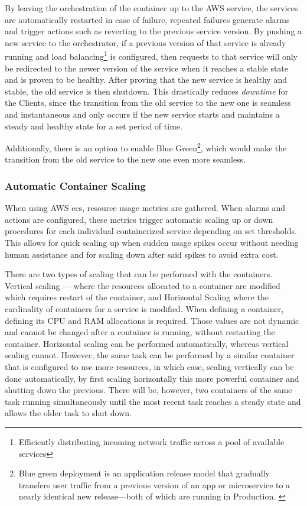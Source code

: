 By leaving the orchestration of the container up to the AWS service, the services are automatically restarted in case of failure, repeated failures generate alarms and trigger actions such as reverting to the previous service version. By pushing a new service to the orchestrator, if a previous version of that service is already running and load balancing\footnote{Efficiently distributing incoming network traffic across a pool of available services\label{foot:load-balancing}} is configured, then requests to that service will only be redirected to the newer version of the service when it reaches a stable state and is proven to be healthy. After proving that the new service is healthy and stable, the old service is then shutdown.
This drastically reduces \textit{downtime} for the Clients, since the transition from the old service to the new one is seamless and instantaneous and only occurs if the new service starts and maintains a steady and healthy state for a set period of time.

Additionally, there is an option to enable Blue Green\footnote{Blue green deployment is an application release model that gradually transfers user traffic from a previous version of an app or microservice to a nearly identical new release—both of which are running in Production. \label{foot:blue-green}}, which would make the transition from the old service to the new one even more seamless.

\subsubsection{Automatic Container Scaling}\label{methodology:sss:automatic-container-scaling}

When using AWS \gls{ecs}, resource usage metrics are gathered. When alarms and actions are configured, these metrics trigger automatic scaling up or down procedures for each individual containerized service depending on set thresholds. This allows for quick scaling up when sudden usage spikes occur without needing human assistance and for scaling down after said spikes to avoid extra cost.

There are two types of scaling that can be performed with the containers. Vertical scaling --- where the resources allocated to a container are modified which requires restart of the container, and Horizontal Scaling where the cardinality of containers for a service is modified. When defining a container, defining its CPU and RAM allocations is required. Those values are not dynamic and cannot be changed after a container is running, without restarting the container. Horizontal scaling can be performed automatically, whereas vertical scaling cannot. However, the same task can be performed by a similar container that is configured to use more resources, in which case, scaling vertically can be done automatically, by first scaling horizontally this more powerful container and shutting down the previous. There will be, however, two containers of the same task running simultaneously until the most recent task reaches a steady state and allows the older task to shut down.

